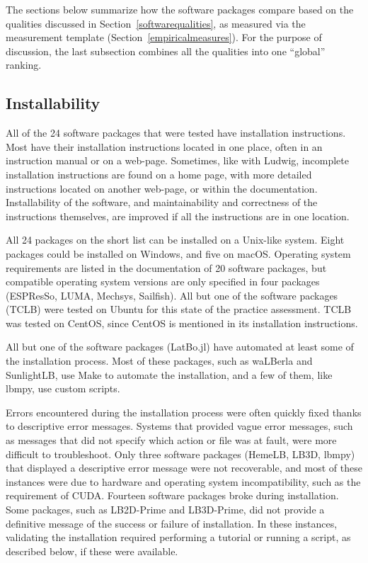 \documentclass[final, 3p, times, authoryear]{elsarticle}
\begin{document}
The sections below summarize how the software packages compare based on the
qualities discussed in Section~\ref{softwarequalities}, as measured via the
measurement template (Section~\ref{empiricalmeasures}).  For the purpose of
discussion, the last subsection combines all the qualities into one ``global''
ranking.

\subsection{Installability}

All of the 24 software packages that were tested have installation instructions.
Most have their installation instructions located in one place, often in an
instruction manual or on a web-page. Sometimes, like with Ludwig, incomplete
installation instructions are found on a home page, with more detailed
instructions located on another web-page, or within the documentation.
Installability of the software, and maintainability and correctness of the
instructions themselves, are improved if all the instructions are in one
location. 

All 24 packages on the short list can be installed on a Unix-like system. Eight
packages could be installed on Windows, and five on macOS. Operating system
requirements are listed in the documentation of 20 software packages, but
compatible operating system versions are only specified in four packages
(ESPResSo, LUMA, Mechsys, Sailfish). All but one of the software packages (TCLB)
were tested on Ubuntu for this state of the practice assessment. TCLB was tested
on CentOS, since CentOS is mentioned in its installation instructions.

All but one of the software packages (LatBo.jl) have automated at least some of
the installation process. Most of these packages, such as waLBerla and
SunlightLB, use Make to automate the installation, and a few of them, like
lbmpy, use custom scripts.

Errors encountered during the installation process were often quickly fixed
thanks to descriptive error messages. Systems that provided vague error
messages, such as messages that did not specify which action or file was at
fault, were more difficult to troubleshoot. Only three software packages
(HemeLB, LB3D, lbmpy) that displayed a descriptive error message were not
recoverable, and most of these instances were due to hardware and operating
system incompatibility, such as the requirement of CUDA. Fourteen software
packages broke during installation. Some packages, such as LB2D-Prime and
LB3D-Prime, did not provide a definitive message of the success or failure of
installation. In these instances, validating the installation required
performing a tutorial or running a script, as described below, if these were
available. 
\end{document}
